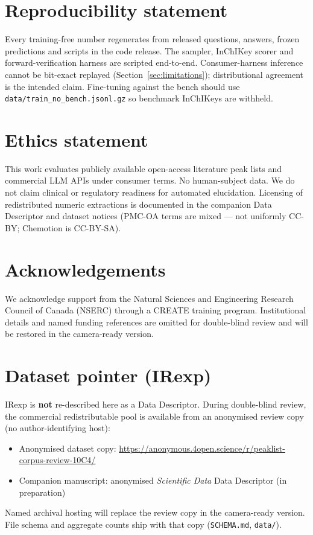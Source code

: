 \documentclass{article}
\begin{document}
\section*{Reproducibility statement}
Every training-free number regenerates from released questions, answers, frozen predictions
and scripts in the code release.
The sampler, InChIKey scorer and forward-verification harness are scripted end-to-end.
Consumer-harness inference cannot be bit-exact replayed (Section~\ref{sec:limitations});
distributional agreement is the intended claim.
Fine-tuning against the bench should use \texttt{data/train\_no\_bench.jsonl.gz} so benchmark
InChIKeys are withheld.

\section*{Ethics statement}
This work evaluates publicly available open-access literature peak lists and commercial LLM
APIs under consumer terms.
No human-subject data.
We do not claim clinical or regulatory readiness for automated elucidation.
Licensing of redistributed numeric extractions is documented in the companion Data Descriptor
and dataset notices (PMC-OA terms are mixed --- not uniformly CC-BY; Chemotion is CC-BY-SA).

\enlargethispage{5\baselineskip}
\section*{Acknowledgements}
We acknowledge support from the Natural Sciences and Engineering Research Council of Canada (NSERC) through a CREATE training program. Institutional details and named funding references are omitted for double-blind review and will be restored in the camera-ready version.



\appendix

\section{Dataset pointer (IRexp)}
\label{app:dataset}

IRexp is \textbf{not} re-described here as a Data Descriptor.
During double-blind review, the commercial redistributable pool is available from an anonymised review copy (no author-identifying host):
\begin{itemize}
  \item Anonymised dataset copy: \url{https://anonymous.4open.science/r/peaklist-corpus-review-10C4/}
  \item Companion manuscript: anonymised \textit{Scientific Data} Data Descriptor (in preparation)~\citep{yabbarov2026irexp}
\end{itemize}
Named archival hosting will replace the review copy in the camera-ready version.
File schema and aggregate counts ship with that copy (\texttt{SCHEMA.md}, \texttt{data/}).
\end{document}
